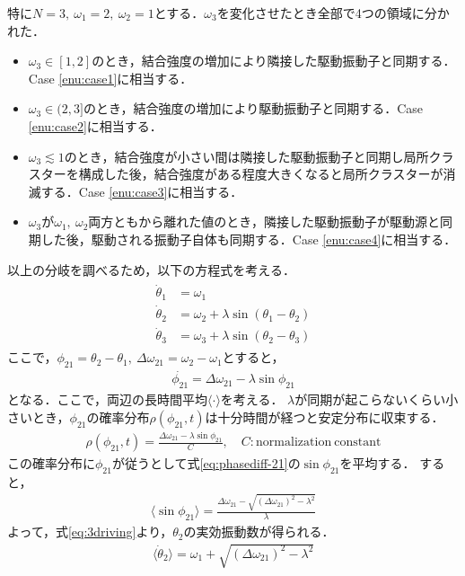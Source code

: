 \documentclass[../main]{subfiles}
\begin{document}
特に$N=3,\ \omega_1=2,\ \omega_2=1$とする．$\omega_3$を変化させたとき全部で4つの領域に分かれた．
\begin{itemize}
    \item $\omega_3\in[1,2]$のとき，結合強度の増加により隣接した駆動振動子と同期する．Case \ref{enu:case1}に相当する．
    \item $\omega_3\in(2,3]$のとき，結合強度の増加により駆動振動子と同期する．Case \ref{enu:case2}に相当する．
    \item $\omega_3\lesssim 1$のとき，結合強度が小さい間は隣接した駆動振動子と同期し局所クラスターを構成した後，結合強度がある程度大きくなると局所クラスターが消滅する．Case \ref{enu:case3}に相当する．
    \item $\omega_3$が$\omega_1,\ \omega_2$両方ともから離れた値のとき，隣接した駆動振動子が駆動源と同期した後，駆動される振動子自体も同期する．Case \ref{enu:case4}に相当する．
\end{itemize}
以上の分岐を調べるため，以下の方程式を考える．
\begin{align}
    \label{eq:3driving}
    \begin{split}
        \dot{\theta}_1&=\omega_1\\
        \dot{\theta}_2&=\omega_2+\lambda\sin(\theta_1-\theta_2)\\
        \dot{\theta}_3&=\omega_3+\lambda\sin(\theta_2-\theta_3)
    \end{split}
\end{align}
ここで，$\phi_{21}=\theta_2-\theta_1,\ \Delta\omega_{21}=\omega_2-\omega_1$とすると，
\begin{align}
    \label{eq:phasediff-21}
    \dot{\phi_{21}}=\Delta\omega_{21}-\lambda\sin\phi_{21}
\end{align}
となる．ここで，両辺の長時間平均$\langle\cdot\rangle$を考える．
$\lambda$が同期が起こらないくらい小さいとき，$\phi_{21}$の確率分布$\rho(\phi_{21},t)$は十分時間が経つと安定分布に収束する．
\begin{align*}
    \rho(\phi_{21},t)=\frac{\Delta\omega_{21}-\lambda\sin\phi_{21}}{C},\quad C:\mathrm{normalization\ constant}
\end{align*}
この確率分布に$\phi_{21}$が従うとして式\eqref{eq:phasediff-21}の$\sin\phi_{21}$を平均する．
すると，
\begin{align*}
    \langle\sin\phi_{21}\rangle=\frac{\Delta\omega_{21}-\sqrt{(\Delta\omega_{21})^2-\lambda^2}}{\lambda}
\end{align*}
よって，式\eqref{eq:3driving}より，$\theta_2$の実効振動数が得られる．
\begin{align*}
    \langle\dot{\theta}_2\rangle=\omega_1+\sqrt{(\Delta\omega_{21})^2-\lambda^2}
\end{align*}
\end{document}
